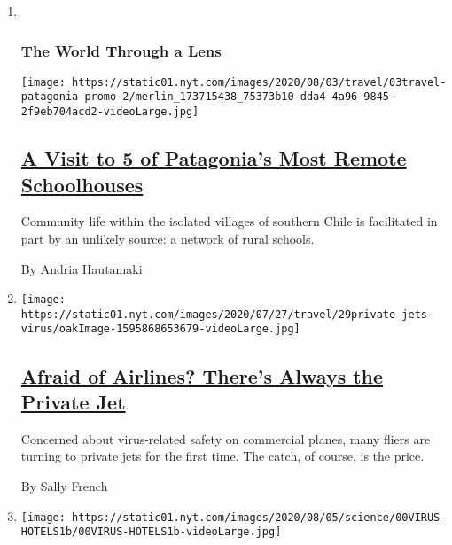 \begin{enumerate}
\def\labelenumi{\arabic{enumi}.}
\item ~
  \hypertarget{the-world-through-a-lens}{%
  \subsubsection{The World Through a
  Lens}\label{the-world-through-a-lens}}

  \texttt{[image: https://static01.nyt.com/images/2020/08/03/travel/03travel-patagonia-promo-2/merlin\_173715438\_75373b10-dda4-4a96-9845-2f9eb704acd2-videoLarge.jpg]}

  \hypertarget{a-visit-to-5-of-patagonias-most-remote-schoolhouses}{%
  \subsection{\texorpdfstring{\href{/2020/08/03/travel/remote-schools-patagonia.html}{A
  Visit to 5 of Patagonia's Most Remote
  Schoolhouses}}{A Visit to 5 of Patagonia's Most Remote Schoolhouses}}\label{a-visit-to-5-of-patagonias-most-remote-schoolhouses}}

  Community life within the isolated villages of southern Chile is
  facilitated in part by an unlikely source: a network of rural schools.

  By Andria Hautamaki
\item
  \texttt{[image: https://static01.nyt.com/images/2020/07/27/travel/29private-jets-virus/oakImage-1595868653679-videoLarge.jpg]}

  \hypertarget{afraid-of-airlines-theres-always-the-private-jet}{%
  \subsection{\texorpdfstring{\href{/2020/07/30/travel/private-jets-coronavirus.html}{Afraid
  of Airlines? There's Always the Private
  Jet}}{Afraid of Airlines? There's Always the Private Jet}}\label{afraid-of-airlines-theres-always-the-private-jet}}

  Concerned about virus-related safety on commercial planes, many fliers
  are turning to private jets for the first time. The catch, of course,
  is the price.

  By Sally French
\item
  \texttt{[image: https://static01.nyt.com/images/2020/08/05/science/00VIRUS-HOTELS1b/00VIRUS-HOTELS1b-videoLarge.jpg]}

  \hypertarget{forget-spas-and-bars-hotels-tout-housekeeping-to-lure-back-travelers}{%
}
\end{enumerate}
